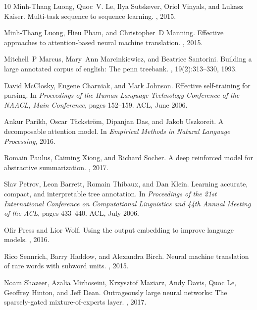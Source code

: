 \documentclass{article}
\begin{document}
\begin{thebibliography}{10}
Minh-Thang Luong, Quoc~V. Le, Ilya Sutskever, Oriol Vinyals, and Lukasz Kaiser.
\newblock Multi-task sequence to sequence learning.
, 2015.

Minh-Thang Luong, Hieu Pham, and Christopher~D Manning.
\newblock Effective approaches to attention-based neural machine translation.
, 2015.

Mitchell~P Marcus, Mary~Ann Marcinkiewicz, and Beatrice Santorini.
\newblock Building a large annotated corpus of english: The penn treebank.
, 19(2):313--330, 1993.

David McClosky, Eugene Charniak, and Mark Johnson.
\newblock Effective self-training for parsing.
\newblock In {\em Proceedings of the Human Language Technology Conference of
  the NAACL, Main Conference}, pages 152--159. ACL, June 2006.

Ankur Parikh, Oscar Täckström, Dipanjan Das, and Jakob Uszkoreit.
\newblock A decomposable attention model.
\newblock In {\em Empirical Methods in Natural Language Processing}, 2016.

Romain Paulus, Caiming Xiong, and Richard Socher.
\newblock A deep reinforced model for abstractive summarization.
, 2017.

Slav Petrov, Leon Barrett, Romain Thibaux, and Dan Klein.
\newblock Learning accurate, compact, and interpretable tree annotation.
\newblock In {\em Proceedings of the 21st International Conference on
  Computational Linguistics and 44th Annual Meeting of the ACL}, pages
  433--440. ACL, July 2006.

Ofir Press and Lior Wolf.
\newblock Using the output embedding to improve language models.
, 2016.

Rico Sennrich, Barry Haddow, and Alexandra Birch.
\newblock Neural machine translation of rare words with subword units.
, 2015.

Noam Shazeer, Azalia Mirhoseini, Krzysztof Maziarz, Andy Davis, Quoc Le,
  Geoffrey Hinton, and Jeff Dean.
\newblock Outrageously large neural networks: The sparsely-gated
  mixture-of-experts layer.
, 2017.


\end{thebibliography}
\end{document}

